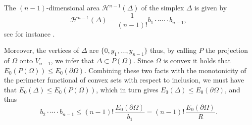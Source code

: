 \documentclass[10pt,leqno]{amsart}
\makeatletter
\newcommand{\R}[0]{\mathbb{R}}
\newcommand{\p}{\partial}
\numberwithin{Theorem}{section}
\theoremstyle{definition}
\theoremstyle{remark}
\numberwithin{equation}{section}
\numberwithin{equation}{section}
\newcommand{\gyula}[1]{{\color{blue}Gyula: {#1}}}
\newenvironment{customproof}[1]{%
  \par\pushQED{\qed}%
  \normalfont\topsep6pt \trivlist
  \item[\hskip\labelsep\itshape
    Proof of #1\@addpunct{.}]\ignorespaces
}{%
  \popQED\endtrivlist\@endpefalse
}
\makeatother
\begin{document}
\begin{customproof}{Lemma \ref{lm:bound_on_max_radius_decreasing}}
The $(n-1)$-dimensional area $\mathcal{H}^{n-1}(\Delta)$ of the simplex $\Delta$ is given by
\begin{equation}\label{eq:gy:area of simplex}
\mathcal{H}^{n-1}(\Delta)=\frac{1}{(n-1)!}b_1  \cdot \cdot \cdots \cdot b_{n-1},
\end{equation}
see for instance \cite[Formula 9.12.4.3]{berger2009geometry}.

Moreover, the vertices of $\Delta$ are $\{0,y_1,\dots,y_{n-1} \}$ thus, by calling $P$ the projection of $\Omega$ onto $V_{n-1}$, we infer that $\Delta \subset P(\Omega)$. Since $\Omega$ is convex it holds that $E_0(P(\Omega)) \leq E_0(\p \Omega)$. Combining these two facts with the monotonicity of the perimeter functional of convex sets with respect to inclusion, we must have that $E_0(\Delta)\leq E_0(P(\Omega))$, which in turn gives $E_0(\Delta) \leq E_0(\p \Omega)$, and thus
\begin{equation}
 \label{eq:b times R const}
  b_2 \cdot \cdots \cdot b_{n-1}\leq (n-1)!\, \frac{E_0(\partial\Omega)}{b_1}
  =(n-1)!\, \frac{E_0(\partial\Omega)}{R}.
\end{equation}




\end{customproof}
\end{document}
